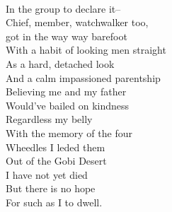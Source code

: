 \documentclass[smalldemyvopaper,11pt,twoside,onecolumn,openright,extrafontsizes]{memoir}
\begin{document}
\\In the group to declare it--
\\Chief, member, watchwalker too,
\\got in the way way barefoot
\\With a habit of looking men straight
\\As a hard, detached look
\\And a calm impassioned parentship
\\Believing me and my father
\\Would've bailed on kindness
\\Regardless my belly
\\With the memory of the four
\\Wheedles I leded them
\\Out of the Gobi Desert
\\I have not yet died
\\But there is no hope
\\For such as I to dwell.
\end{document}
